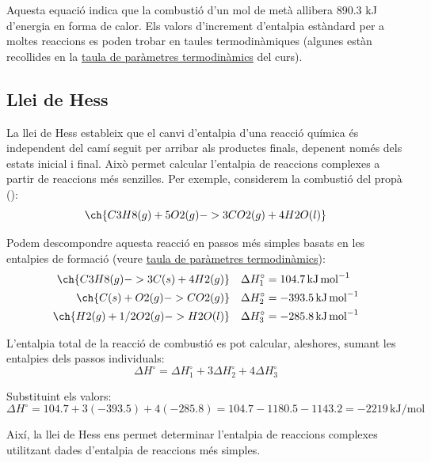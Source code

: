 Aquesta equació indica que la combustió d'un mol de metà allibera 890.3 kJ d'energia en forma de calor. Els valors d'increment d'entalpia estàndard per a moltes reaccions es poden trobar en taules termodinàmiques\cite{lide_crc_2005} (algunes estàn recollides en la \href{https://biocomputing-teaching.github.io/WebQuimicaAutomocio/pdf/TaulaUnitats.pdf}{taula de paràmetres termodinàmics} del curs).

\subsection{Llei de Hess}

La llei de Hess estableix que el canvi d'entalpia d'una reacció química és independent del camí seguit per arribar als productes finals, depenent només dels estats inicial i final. Això permet calcular l'entalpia de reaccions complexes a partir de reaccions més senzilles. Per exemple, considerem la combustió del propà ():
\begin{equation}
\ch{C3H8(g) + 5 O2(g) -> 3 CO2(g) + 4 H2O(l)}
\end{equation}

Podem descompondre aquesta reacció en passos més simples basats en les entalpies de formació (veure \href{https://biocomputing-teaching.github.io/WebQuimicaAutomocio/pdf/TaulaUnitats.pdf}{taula de paràmetres termodinàmics}):
\begin{align}
\ch{C3H8(g) -> 3 C(s) + 4 H2(g)} & \quad \Delta H_1^\circ = 104.7 \, \si{\kilo\joule\per\mole} \\
\ch{C(s) + O2(g) -> CO2(g)} & \quad \Delta H_2^\circ = -393.5 \, \si{\kilo\joule\per\mole} \\
\ch{H2(g) + 1/2 O2(g) -> H2O(l)} & \quad \Delta H_3^\circ = -285.8 \, \si{\kilo\joule\per\mole}
\end{align}

L'entalpia total de la reacció de combustió es pot calcular, aleshores, sumant les entalpies dels passos individuals:
\begin{equation}
\Delta H^\circ = \Delta H_1^\circ + 3 \Delta H_2^\circ + 4 \Delta H_3^\circ
\end{equation}

Substituint els valors:
\begin{equation*}
\Delta H^\circ = 104.7 + 3(-393.5) + 4(-285.8) = 104.7 - 1180.5 - 1143.2 = -2219 \, \si{\kilo\joule\per\mole}
\end{equation*}

Així, la llei de Hess ens permet determinar l'entalpia de reaccions complexes utilitzant dades d'entalpia de reaccions més simples.

